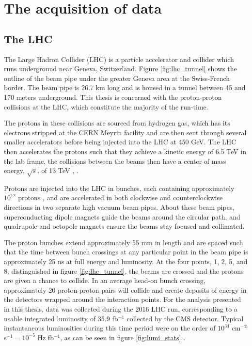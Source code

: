 \chapter{The acquisition of data}

\section{The LHC}
  The Large Hadron Collider (LHC) is a particle accelerator and collider which runs underground near Geneva, Switzerland. Figure \ref{fig:lhc_tunnel} shows the outline of the beam pipe under the greater Geneva area at the Swiss-French border. The beam pipe is 26.7 km long and is housed in a tunnel between 45 and 170 meters underground. This thesis is concerned with the proton-proton collisions at the LHC, which constitute the majority of the run-time. 

  The protons in these collisions are sourced from hydrogen gas, which has its electrons stripped at the CERN Meyrin facility and are then sent through several smaller accelerators before being injected into the LHC at 450 GeV. The LHC then accelerates the protons such that they achieve a kinetic energy of 6.5 TeV in the lab frame, the collisions between the beams then have a center of mass energy, $\sqrt{s}$, of 13 TeV \cite{LHC_JINST}, \cite{LHC_TDR}. 

  Protons are injected into the LHC in bunches, each containing approximately $10^{12}$ protons \cite{Lumi_unc}, and are accelerated in both clockwise and counterclockwise directions in two separate high vacuum beam pipes. About these beam pipes, superconducting dipole magnets guide the beams around the circular path, and quadrupole and octopole magnets ensure the beams stay focused and collimated.

  The proton bunches extend approximately 55 mm in length and are spaced such that the time between bunch crossings at any particular point in the beam pipe is approximately 25 ns at full energy and luminosity. At the four points, 1, 2, 5, and 8, distinguished in figure \ref{fig:lhc_tunnel}, the beams are crossed and the protons are given a chance to collide. In an average head-on bunch crossing, approximately 20 proton-proton pairs will collide and create deposits of energy in the detectors wrapped around the interaction points. For the analysis presented in this thesis, data was collected during the 2016 LHC run, corresponding to a usable integrated luminosity of 35.9 fb$^{-1}$ collected by the CMS detector. Typical instantaneous luminosities during this time period were on the order of $10^{34}$ cm$^{-2}$ s$^{-1} = 10^{-5}$ Hz fb$^{-1}$, as can be seen in figure \ref{fig:lumi_stats} \cite{lumi_twiki}.

